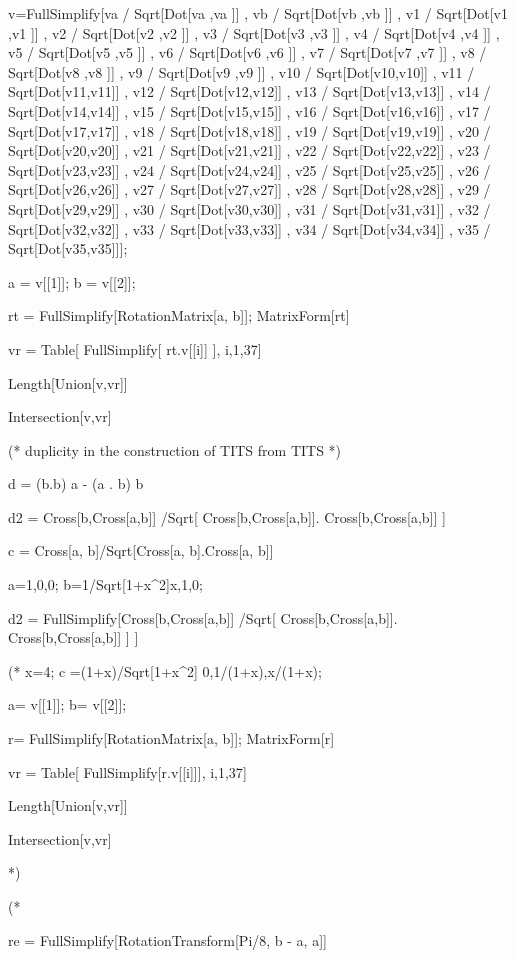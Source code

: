 v=FullSimplify[{va / Sqrt[Dot[va ,va ]] ,
 vb / Sqrt[Dot[vb ,vb ]] ,
 v1 / Sqrt[Dot[v1 ,v1 ]] ,
 v2 / Sqrt[Dot[v2 ,v2 ]] ,
 v3 / Sqrt[Dot[v3 ,v3 ]] ,
 v4 / Sqrt[Dot[v4 ,v4 ]] ,
 v5 / Sqrt[Dot[v5 ,v5 ]] ,
 v6 / Sqrt[Dot[v6 ,v6 ]] ,
 v7 / Sqrt[Dot[v7 ,v7 ]] ,
 v8 / Sqrt[Dot[v8 ,v8 ]] ,
 v9 / Sqrt[Dot[v9 ,v9 ]] ,
 v10 / Sqrt[Dot[v10,v10]] ,
 v11 / Sqrt[Dot[v11,v11]] ,
 v12 / Sqrt[Dot[v12,v12]] ,
 v13 / Sqrt[Dot[v13,v13]] ,
 v14 / Sqrt[Dot[v14,v14]] ,
 v15 / Sqrt[Dot[v15,v15]] ,
 v16 / Sqrt[Dot[v16,v16]] ,
 v17 / Sqrt[Dot[v17,v17]] ,
 v18 / Sqrt[Dot[v18,v18]] ,
 v19 / Sqrt[Dot[v19,v19]] ,
 v20 / Sqrt[Dot[v20,v20]] ,
 v21 / Sqrt[Dot[v21,v21]] ,
 v22 / Sqrt[Dot[v22,v22]] ,
 v23 / Sqrt[Dot[v23,v23]] ,
 v24 / Sqrt[Dot[v24,v24]] ,
 v25 / Sqrt[Dot[v25,v25]] ,
 v26 / Sqrt[Dot[v26,v26]] ,
 v27 / Sqrt[Dot[v27,v27]] ,
 v28 / Sqrt[Dot[v28,v28]] ,
 v29 / Sqrt[Dot[v29,v29]] ,
 v30 / Sqrt[Dot[v30,v30]] ,
 v31 / Sqrt[Dot[v31,v31]] ,
 v32 / Sqrt[Dot[v32,v32]] ,
 v33 / Sqrt[Dot[v33,v33]] ,
 v34 / Sqrt[Dot[v34,v34]] ,
 v35 / Sqrt[Dot[v35,v35]]}];


a = v[[1]]; b = v[[2]];

rt = FullSimplify[RotationMatrix[{a, b}]];
MatrixForm[rt]

vr = Table[ FullSimplify[ rt.v[[i]] ], {i,1,37}]

Length[Union[v,vr]]

Intersection[v,vr]

(* duplicity in the construction of TITS from TITS *)

d = (b.b) a - (a . b) b

d2 = Cross[b,Cross[a,b]] /Sqrt[ Cross[b,Cross[a,b]]. Cross[b,Cross[a,b]] ]

c = Cross[a, b]/Sqrt[Cross[a, b].Cross[a, b]]

a={1,0,0};
b=1/Sqrt[1+x^2]{x,1,0};

d2 = FullSimplify[Cross[b,Cross[a,b]] /Sqrt[ Cross[b,Cross[a,b]]. Cross[b,Cross[a,b]] ] ]


(* x=4; c =(1+x)/Sqrt[1+x^2] {0,1/(1+x),x/(1+x)};

a= v[[1]]; b= v[[2]];

r= FullSimplify[RotationMatrix[{a, b}]];
MatrixForm[r]

vr = Table[ FullSimplify[r.v[[i]]], {i,1,37}]

Length[Union[v,vr]]

Intersection[v,vr]

*)

(*

re = FullSimplify[RotationTransform[Pi/8, b - a, a]]

